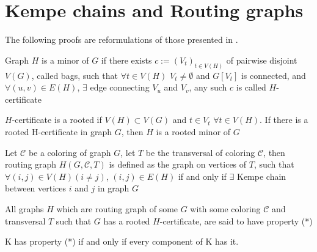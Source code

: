 \chapter{Kempe chains and Routing graphs}
The following proofs are reformulations of those presented in \cite{matthias_2022}.

\begin{defn}[H-certificate]
    Graph $H$ is a minor of $G$ if there exists $c := (V_{t})_{t \in V(H)}$ of pairwise disjoint $V(G)$,
     called bags, such that $\forall t \in V(H)$ $V_{t} \neq \emptyset$ and $G[V_{t}]$ is connected, and $\forall (u,v) \in E(H)$,
     $\exists$ edge connecting $V_{u}$ and $V_{v}$, any such $c$ is called $H$-certificate
\end{defn}

\begin{defn}
    $H$-certificate is a rooted if $V(H) \subset V(G)$ and $t \in V_{t}$ $\forall t \in V(H)$. If there is a rooted H-certificate in graph $G$,
    then $H$ is a rooted minor of $G$
\end{defn}

\begin{defn}
Let $\mathcal{C}$ be a coloring of graph $G$, let $T$ be the transversal of coloring $\mathcal{C}$, 
then routing graph $H(G, \mathcal{C}, T)$ is defined as the graph on vertices of $T$, 
such that $\forall (i,j) \in V(H) (i \neq j)$, $(i,j) \in E(H)$ if and only if 
$\exists$ Kempe chain between vertices $i$ and $j$ in graph $G$
\end{defn}

\begin{defn}[Property (*)]
    All graphs $H$ which are routing graph of some $G$ with some coloring $\mathcal{C}$ and transversal $T$
    such that $G$ has a rooted $H$-certificate, are said to have property (*)
\end{defn}

\begin{thm}
    K has property (*) if and only if every component of K has it.
\end{thm}

